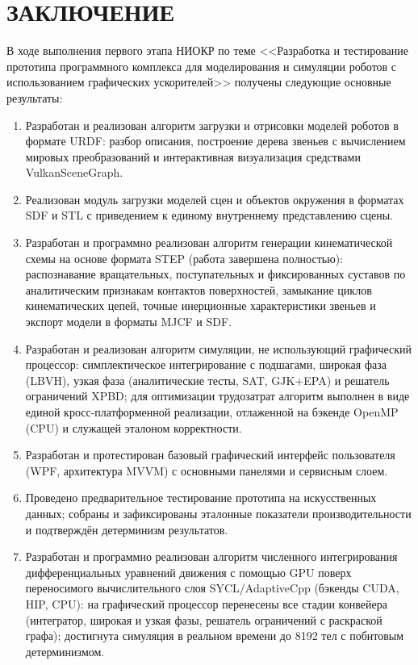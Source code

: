 \chapter*{ЗАКЛЮЧЕНИЕ}

В ходе выполнения первого этапа НИОКР по теме <<Разработка и тестирование
прототипа программного комплекса для моделирования и симуляции роботов с
использованием графических ускорителей>> получены следующие основные результаты:

\begin{enumerate}
  \item Разработан и реализован алгоритм загрузки и отрисовки моделей роботов в
        формате URDF: разбор описания, построение дерева звеньев с вычислением
        мировых преобразований и интерактивная визуализация средствами
        VulkanSceneGraph.
  \item Реализован модуль загрузки моделей сцен и объектов окружения в форматах
        SDF и STL с приведением к единому внутреннему представлению сцены.
  \item Разработан и программно реализован алгоритм генерации кинематической
        схемы на основе формата STEP (работа завершена полностью):
        распознавание вращательных, поступательных и фиксированных суставов по
        аналитическим признакам контактов поверхностей, замыкание циклов
        кинематических цепей, точные инерционные характеристики звеньев и
        экспорт модели в форматы MJCF и SDF.
  \item Разработан и реализован алгоритм симуляции, не использующий графический
        процессор: симплектическое интегрирование с подшагами, широкая фаза
        (LBVH), узкая фаза (аналитические тесты, SAT, GJK+EPA) и решатель
        ограничений XPBD; для оптимизации трудозатрат алгоритм выполнен в виде
        единой кросс-платформенной реализации, отлаженной на бэкенде OpenMP
        (CPU) и служащей эталоном корректности.
  \item Разработан и протестирован базовый графический интерфейс пользователя
        (WPF, архитектура MVVM) с основными панелями и сервисным слоем.
  \item Проведено предварительное тестирование прототипа на искусственных
        данных; собраны и зафиксированы эталонные показатели производительности и
        подтверждён детерминизм результатов.
  \item Разработан и программно реализован алгоритм численного интегрирования
        дифференциальных уравнений движения с помощью GPU поверх переносимого
        вычислительного слоя SYCL/AdaptiveCpp (бэкенды CUDA, HIP, CPU): на
        графический процессор перенесены все стадии конвейера (интегратор,
        широкая и узкая фазы, решатель ограничений с раскраской графа);
        достигнута симуляция в реальном времени до 8192 тел с побитовым
        детерминизмом.
\end{enumerate}

